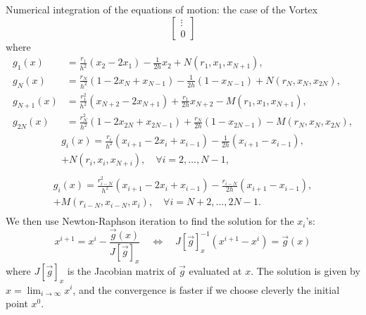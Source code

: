 \begin{section}{Numerical integration of the equations of motion: the case of the Vortex}
\begin{equation}
\begin{bmatrix}
      \vdots\\
      0
    \end{bmatrix}
  \end{equation}
  where
  \begin{align}
    g_1(x) &= \frac{r_1}{h^2}\left(x_2-2x_1\right)-\frac{1}{2h}x_2+N(r_1,x_1,x_{N+1}),\\
    g_N(x) &= \frac{r_N}{h^2}\left(1-2x_N+x_{N-1}\right)-\frac{1}{2h}\left(1-x_{N-1}\right)+N(r_N,x_N,x_{2N}),\\
    g_{N+1}(x)& = \frac{r_1^2}{h^2}\left(x_{N+2}-2x_{N+1}\right)+\frac{r_1}{2h}x_{N+2}-M(r_1,x_1, x_{N+1}),\\
    g_{2N}(x) &= \frac{r_N^2}{h^2}\left(1-2x_{2N}+x_{2N-1}\right)+\frac{r_N}{2h}\left(1-x_{2N-1}\right)-M(r_N,x_N, x_{2N}),
  \end{align}
  \begin{multline}
    g_i(x) = \frac{r_i}{h^2}\left(x_{i+1}-2x_i+x_{i-1}\right)-\frac{1}{2h}\left(x_{i+1}-x_{i-1}\right),\\
    +N(r_i, x_i, x_{N+i}),\quad
    \forall i = 2,\dots,N-1,\\
  \end{multline}
  \begin{multline}
    g_i(x) = \frac{r_{i-N}^2}{h^2}\left(x_{i+1}-2x_i+x_{i-1}\right)-\frac{r_{i-N}}{2h}\left(x_{i+1}-x_{i-1}\right),\\
    +M(r_{i-N}, x_{i-N}, x_i),\quad
    \forall i = N+2,\dots,2N-1.\\    
  \end{multline}
  We then use Newton-Raphson iteration to find the solution for the
  $x_i$'s:
  \begin{equation}
    x^{i+1} = x^i - \frac{\vec g(x)}{J[\vec g]_x}\quad \Longleftrightarrow\quad J[\vec g]_x^{-1}\left(x^{i+1}-x^i\right) = \vec g(x)
  \end{equation}
  where $J[\vec g]_x$ is the Jacobian matrix of $\vec g$ evaluated at
  $x$. The solution is given by $x = \lim_{i\to\infty}x^i$, and the
  convergence is faster if we choose cleverly the initial point $x^0$.
\end{section}
